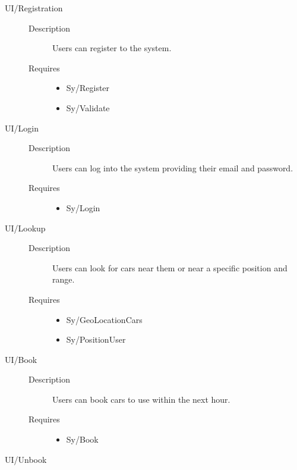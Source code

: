 \documentclass[11pt]{article} %
\begin{document}
\begin{description}
	\item[UI/Registration] \hfill
	\begin{description}
		\item[Description] Users can register to the system.
		\item[Requires] \hfill
		\begin{itemize}
			\item Sy/Register %
			\item Sy/Validate %
		\end{itemize}
	\end{description}
	\item[UI/Login] \hfill
	\begin{description}
		\item[Description] Users can log into the system providing their email and password.
		\item[Requires] \hfill
		\begin{itemize}
			\item Sy/Login %
		\end{itemize}
	\end{description}
	\item[UI/Lookup] \hfill
	\begin{description}
		\item[Description] Users can look for cars near them or near a specific position and range.
		\item[Requires] \hfill
		\begin{itemize}
			\item Sy/GeoLocationCars %
			\item Sy/PositionUser %
		\end{itemize}
	\end{description}
	\item[UI/Book] \hfill
	\begin{description}
		\item[Description] Users can book cars to use within the next hour.
		\item[Requires] \hfill
		\begin{itemize}
			\item Sy/Book %
		\end{itemize}
	\end{description}
	\item[UI/Unbook] \hfill

\end{description}
\end{document}
